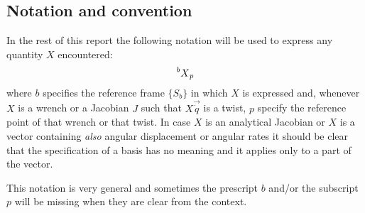 \subsection{Notation and convention}
In the rest of this report the following notation will be used to express any quantity $X$ encountered:
\[
\prescript{b}{}{X}_p
\]
where $b$ specifies the reference frame $\{S_b\}$ in which $X$ is expressed and, whenever
$X$ is a wrench or a Jacobian $J$ such that $X\vec{\dot{q}}$ is a twist, $p$ specify the
reference point of that wrench or that twist. In case $X$ is an analytical Jacobian or $X$ is a vector
containing \emph{also} angular displacement or angular rates it should be clear that the specification
of a basis has no meaning and it applies only to a part of the vector.
\par
This notation is very general and sometimes the prescript $b$ and/or the subscript $p$ will
be missing when they are clear from the context.

\newpage


